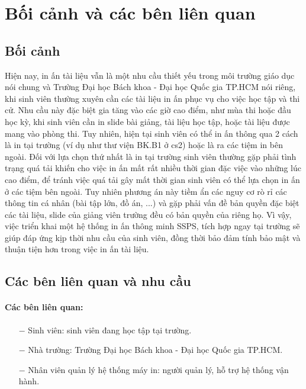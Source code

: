 \documentclass[a4paper]{article}
\begin{document}
\section{Bối cảnh và các bên liên quan}
\subsection{Bối cảnh}
Hiện nay, in ấn tài liệu vẫn là một nhu cầu thiết yếu trong môi trường giáo dục nói chung và Trường Đại học Bách khoa - Đại học Quốc gia TP.HCM nói riêng, khi sinh viên thường xuyên cần các tài liệu in ấn phục vụ cho việc học tập và thi cử. Nhu cầu này đặc biệt gia tăng vào các giờ cao điểm, như mùa thi hoặc đầu học kỳ, khi sinh viên cần in slide bài giảng, tài liệu học tập, hoặc tài liệu được mang vào phòng thi. Tuy nhiên, hiện tại sinh viên có thể in ấn thông qua 2 cách là in tại trường (ví dụ như thư viện BK.B1 ở cs2) hoặc là ra các tiệm in bên ngoài. Đối với lựa chọn thứ nhất là in tại trường sinh viên thường gặp phải tình trạng quá tải khiến cho việc in ấn mất rất nhiều thời gian đặc việc vào những lúc cao điểm, để tránh việc quá tải gây mất thời gian sinh viên có thể lựa chọn in ấn ở các tiệm bên ngoài. Tuy nhiên phương án này tiềm ẩn các nguy cơ rò rỉ các thông tin cá nhân (bài tập lớn, đồ án, ...) và gặp phải vấn đề bản quyền đặc biệt các tài liệu, slide của giảng viên trường đều có bản quyền của riêng họ. Vì vậy, việc triển khai một hệ thống in ấn thông minh SSPS, tích hợp ngay tại trường sẽ giúp đáp ứng kịp thời nhu cầu của sinh viên, đồng thời bảo đảm tính bảo mật và thuận tiện hơn trong việc in ấn tài liệu.

\subsection{Các bên liên quan và nhu cầu}
\paragraph*{Các bên liên quan:}
\begin{itemize}
    \item[$-$] Sinh viên: sinh viên đang học tập tại trường.
    \item[$-$] Nhà trường: Trường Đại học Bách khoa - Đại học Quốc gia TP.HCM.
    \item[$-$] Nhân viên quản lý hệ thống máy in: người quản lý, hỗ trợ hệ thống vận hành.
\end{itemize}
\end{document}
